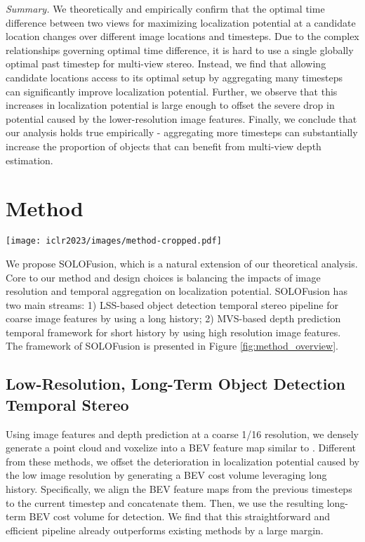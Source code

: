 \documentclass[runningheads, hyperfootnotes=false]{article}
\begin{document}
\noindent\textit{Summary.} We theoretically and empirically confirm that the optimal time difference between two views for maximizing localization potential at a candidate location changes over different image locations and timesteps. Due to the complex relationships governing optimal time difference, it is hard to use a single globally optimal past timestep for multi-view stereo. Instead, we find that allowing candidate locations access to its optimal setup by aggregating many timesteps can significantly improve localization potential. Further, we observe that this increases in localization potential is large enough to offset the severe drop in potential caused by the lower-resolution image features. Finally, we conclude that our analysis holds true empirically - aggregating more timesteps can substantially increase the proportion of objects that can benefit from multi-view depth estimation. \section{Method}
\begin{figure*}[t]
  \centering
  \texttt{[image: iclr2023/images/method-cropped.pdf]}
  \captionsetup{aboveskip=0pt}\captionsetup{belowskip=0pt}\caption{The framework of SOLOFusion.}
  \label{fig:method_overview}
\end{figure*} We propose SOLOFusion, which is a natural extension of our theoretical analysis. Core to our method and design choices is balancing the impacts of image resolution and temporal aggregation on localization potential. SOLOFusion has two main streams: 1) LSS-based object detection temporal stereo pipeline for coarse image features by using a long history; 2) MVS-based depth prediction temporal framework for short history by using high resolution image features. The framework of SOLOFusion is presented in Figure \ref{fig:method_overview}. 

\subsection{Low-Resolution, Long-Term Object Detection Temporal Stereo}\label{sec:method_long}
Using image features and depth prediction at a coarse 1/16 resolution, we densely generate a point cloud and voxelize into a BEV feature map similar to \citep{huang2021bevdet,li2022bevdepth}. Different from these methods, we offset the deterioration in localization potential caused by the low image resolution by generating a BEV cost volume leveraging long history. Specifically, we align the BEV feature maps from the previous  timesteps to the current timestep and concatenate them. Then, we use the resulting long-term BEV cost volume for detection. We find that this straightforward and efficient pipeline already outperforms existing methods by a large margin.
\end{document}
